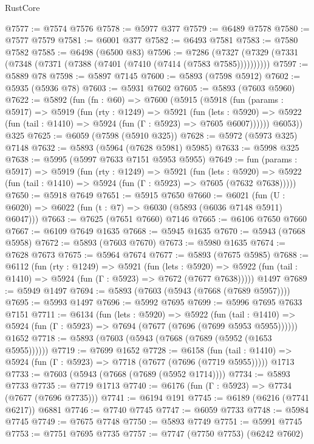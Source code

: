 \begin{lexlean}{RustCore}
\begin{coremodule}
@7577 := @7574 @7576
@7578 := @5977 @377
@7579 := @6489 @7578
@7580 := @7577 @7579
@7581 := @6001 @377
@7582 := @6493 @7581
@7583 := @7580 @7582
@7585 := @6498 (@6500 @83)
@7596 := @7286 (@7327 (@7329 (@7331 (@7348 (@7371 (@7388 (@7401 (@7410 (@7414 (@7583 @7585))))))))))
@7597 := @5889 @78
@7598 := @5897 @7145
@7600 := @5893 (@7598 @5912)
@7602 := @5935 (@5936 @78)
@7603 := @5931 @7602
@7605 := @5893 (@7603 @5960)
@7622 := @5892
    (fun (fn : @60) =>
    @7600
      (@5915
        (@5918
          (fun (params : @5917) =>
          @5919
            (fun (rty : @1249) =>
            @5921
              (fun (lets : @5920) =>
              @5922 (fun (tail : @1410) => @5924 (fun (Γ : @5923) => @7605 @6007))))))
        @6053))
    @325
@7625 := @6059 (@7598 (@5910 @325))
@7628 := @5972 (@5973 @325) @7148
@7632 := @5893 (@5964 (@7628 @5981) @5985)
@7633 := @5998 @325
@7638 := @5995 (@5997 @7633 @7151 @5953 @5955)
@7649 := fun (params : @5917) =>
  @5919
    (fun (rty : @1249) =>
    @5921
      (fun (lets : @5920) =>
      @5922 (fun (tail : @1410) => @5924 (fun (Γ : @5923) => @7605 (@7632 @7638)))))
@7650 := @5918 @7649
@7651 := @5915 @7650
@7660 := @6021 (fun (U : @6020) => @6022 (fun (t : @7) => @6030 (@5893 (@6036 @7148 @5911) @6047)))
@7663 := @7625 (@7651 @7660) @7146
@7665 := @6106 @7650 @7660
@7667 := @6109 @7649 @1635
@7668 := @5945 @1635
@7670 := @5943 (@7668 @5958)
@7672 := @5893 (@7603 @7670)
@7673 := @5980 @1635
@7674 := @7628 @7673
@7675 := @5964 @7674
@7677 := @5893 (@7675 @5985)
@7688 := @6112
    (fun (rty : @1249) =>
    @5921
      (fun (lets : @5920) =>
      @5922 (fun (tail : @1410) => @5924 (fun (Γ : @5923) => @7672 (@7677 @7638)))))
    @1497
@7689 := @5949 @1497
@7694 := @5893 (@7603 (@5943 (@7668 (@7689 @5957))))
@7695 := @5993 @1497
@7696 := @5992 @7695
@7699 := @5996 @7695 @7633 @7151
@7711 := @6134
    (fun (lets : @5920) =>
    @5922
      (fun (tail : @1410) => @5924 (fun (Γ : @5923) => @7694 (@7677 (@7696 (@7699 @5953 @5955))))))
    @1652
@7718 := @5893 (@7603 (@5943 (@7668 (@7689 (@5952 (@1653 @5955))))))
@7719 := @7699 @1652
@7728 := @6158
    (fun (tail : @1410) => @5924 (fun (Γ : @5923) => @7718 (@7677 (@7696 (@7719 @5955)))))
    @1713
@7733 := @7603 (@5943 (@7668 (@7689 (@5952 @1714))))
@7734 := @5893 @7733
@7735 := @7719 @1713
@7740 := @6176 (fun (Γ : @5923) => @7734 (@7677 (@7696 @7735)))
@7741 := @6194 @191
@7745 := @6189 (@6216 (@7741 @6217)) @6881
@7746 := @7740 @7745
@7747 := @6059 @7733
@7748 := @5984 @7745
@7749 := @7675 @7748
@7750 := @5893 @7749
@7751 := @5991 @7745
@7753 := @7751 @7695 @7735
@7757 := @7747 (@7750 @7753) (@6242 @7602)

\end{coremodule}
\end{lexlean}
